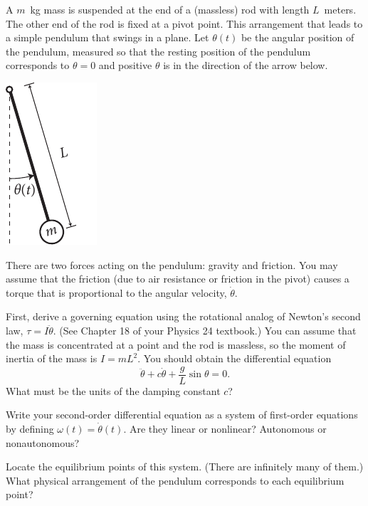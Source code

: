 \documentclass[boxes]{gsypset}
\begin{document}
	\begin{problem}
		A $m$~kg mass is suspended at the end of a (massless) rod with length $L$~meters. 
		The other end of the rod is fixed at a pivot point. 
		This arrangement that leads to a simple pendulum that swings in a plane. 
		Let $\theta(t)$ be the angular position of the pendulum, measured so that 
		the resting position of the pendulum corresponds to $\theta=0$ and 
		positive $\theta$ is in the direction of the arrow below.
		
		\begin{center}
			\includegraphics[width=.75in,keepaspectratio=true]{img/pendulum}
		\end{center}
		
		There are two forces acting on the pendulum: gravity and friction. 
		You may assume that the friction (due to air resistance or friction in the pivot) 
		causes a torque that is proportional to the angular velocity, $\dot{\theta}$.
		 
		\begin{subproblems}
			\subproblem 
				First, derive a governing equation using the rotational analog of Newton's second law, 
				$\tau=I\ddot{\theta}$. 
				(See Chapter 18 of your Physics 24 textbook.) 
				You can assume that the mass is concentrated at a point and the rod is massless, 
				so the moment of inertia of the mass is $I=mL^2$.  
				You should obtain the differential equation
				\[
					\ddot{\theta} + c\dot{\theta} + \frac{g}{L}\sin\theta = 0.
				\]
				What must be the units of the damping constant $c$?
				\begin{solution}
					
				\end{solution}
			\subproblem 
				Write your second-order differential equation as a system of first-order equations 
				by defining $\omega(t)=\dot{\theta}(t)$. 
				Are they linear or nonlinear? 
				Autonomous or nonautonomous?
				\begin{solution}
					
				\end{solution}
			\subproblem 
				Locate the equilibrium points of this system. 
				(There are infinitely many of them.) 
				What physical arrangement of the pendulum corresponds to each equilibrium point?
				\begin{solution}
					

\end{solution}
\end{subproblems}
\end{problem}
\end{document}

